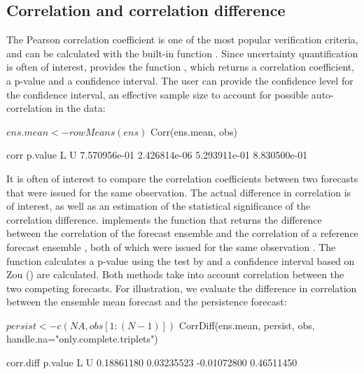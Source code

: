 \documentclass[article]{jss}
\begin{document}
\subsection{Correlation and correlation difference}

The Pearson correlation coefficient is one of the most popular verification criteria, and can be calculated with the built-in  function .
Since uncertainty quantification is often of interest,  provides the function , which returns a correlation coefficient, a p-value and a confidence interval.
The user can provide the confidence level for the confidence interval, an effective sample size to account for possible auto-correlation in the data:

\begin{Schunk}
\begin{Sinput}
$ ens.mean <- rowMeans(ens)
$ Corr(ens.mean, obs)
\end{Sinput}
\begin{Soutput}
        corr      p.value            L            U 
7.570956e-01 2.426814e-06 5.293911e-01 8.830500e-01 
\end{Soutput}
\end{Schunk}


It is often of interest to compare the correlation coefficients between two forecasts that were issued for the same observation.
The actual difference in correlation is of interest, as well as an estimation of the statistical significance of the correlation difference.
 implements the function  that returns the difference between the correlation of the forecast ensemble  and the correlation of a reference forecast ensemble , both of which were issued for the same observation .
The function calculates a p-value using the test by \citet{steiger1980tests} and a confidence interval based on Zou (\citet{zou2007toward}) are calculated.
Both methods take into account correlation between the two competing forecasts.
For illustration, we evaluate the difference in correlation between the ensemble mean forecast and the persistence forecast:


\begin{Schunk}
\begin{Sinput}
$ persist <- c(NA, obs[1:(N-1)])
$ CorrDiff(ens.mean, persist, obs, handle.na="only.complete.triplets")
\end{Sinput}
\begin{Soutput}
  corr.diff     p.value           L           U 
 0.18861180  0.03235523 -0.01072800  0.46511450 
\end{Soutput}
\end{Schunk}
\end{document}
